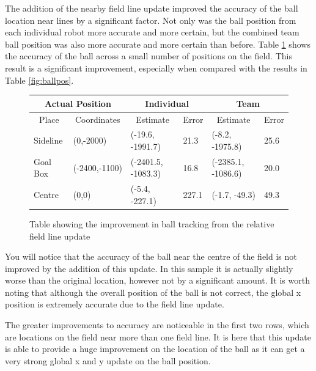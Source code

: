 \documentclass[runningheads,a4paper]{llncs}
\begin{document}
The addition of the nearby field line update improved the accuracy of the ball location near lines by a significant factor. Not only was the ball position from each individual robot more accurate and more certain, but the combined team ball position was also more accurate and more certain than before. Table \ref{fig:flballtable} shows the accuracy of the ball across a small number of positions on the field. This result is a significant improvement, especially when compared with the results in Table \ref{fig:ballpos}.

\begin{figure}[H]
\begin{center}
    \begin{tabular}{ | l | l || l | l || l | l | }
    \hline
    \multicolumn{2}{|c||}{Actual Position} & \multicolumn{2}{|c||}{Individual} & \multicolumn{2}{|c|}{Team} \\ \hline
    \multicolumn{1}{|c|}{Place} & \multicolumn{1}{|c||}{Coordinates} & \multicolumn{1}{|c|}{Estimate} & \multicolumn{1}{|c||}{Error} & \multicolumn{1}{|c|}{Estimate} & \multicolumn{1}{|c|}{Error} \\ \hline
    Sideline & (0,-2000) & (-19.6, -1991.7) & 21.3 & (-8.2, -1975.8) & 25.6 \\ \hline
    Goal Box & (-2400,-1100) & (-2401.5, -1083.3) & 16.8 & (-2385.1, -1086.6) & 20.0 \\ \hline
    Centre & (0,0) & (-5.4, -227.1) & 227.1 & (-1.7, -49.3) & 49.3 \\ \hline
    \end{tabular}
\end{center}
 \caption{Table showing the improvement in ball tracking from the relative field line update}
  \label{fig:flballtable}
\end{figure}

You will notice that the accuracy of the ball near the centre of the field is not improved by the addition of this update. In this sample it is actually slightly worse than the original location, however not by a significant amount. It is worth noting that although the overall position of the ball is not correct, the global x position is extremely accurate due to the field line update.

The greater improvements to accuracy are noticeable in the first two rows, which are locations on the field near more than one field line. It is here that this update is able to provide a huge improvement on the location of the ball as it can get a very strong global x and y update on the ball position. 
\end{document}
